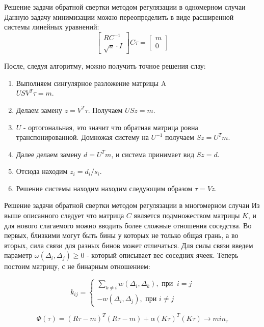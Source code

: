 \documentclass[fullscreen=true,russian,compress,%
	hyperref={unicode,bookmarks=false}]{presentation}
\begin{document}
\begin{frame}{Решение задачи обратной свертки методом регулязации в одномерном случаи}
Данную задачу минимизации можно переопределить в виде расширенной системы линейных уравнений:
\begin{equation}
       \begin{bmatrix}
           RC^{-1} \\
           \sqrt{a} \cdot I
       \end{bmatrix}
       C\tau = 
       \begin{bmatrix}
           m \\
           0
       \end{bmatrix}
       \label{system_one_dim}
   \end{equation}

После, следуя алгоритму, можно получить точное решения слау:

\begin{enumerate}
    \item Выполняем сингулярное разложение матрицы A \\
    $USV^T \tau = m.$
    \item Делаем замену $z = V^T\tau$. Получаем $USz = m.$
    \item $U$ - ортогональная, это значит что обратная матрица ровна транспонированной. Домножая систему на $U^{-1}$ получаем $Sz=U^Tm$.
    \item Далее делаем замену $d=U^Tm$, и система принимает вид $Sz=d$.
    \item Отсюда находим $z_{i} = d_{i} / s_{i}$.
    \item Решение системы находим находим следующим образом $\tau = Vz$.
\end{enumerate}

\end{frame}


\begin{frame}{Решение задачи обратной свертки методом регулязации в многомерном случаи}
   Из выше описанного следует что матрица $C$ является подмножеством матрицы $K$, и для нового слагаемого можно вводить более сложные
   отношения соседства. Во первых, близкими могут быть бины у которых не только общая грань, а во вторых, сила связи для разных бинов
   может отличаться. Для силы связи введем параметр $\omega(\Delta_{i}, \Delta_{j}) \geq 0$ - который описывает вес соседних ячеек. 
   Теперь постоим матрицу, с не бинарным отношением:
   
   \begin{equation}
    k_{ij} =
     \begin{cases}
       \displaystyle\sum_{k\neq i} w(\Delta_{i}, \Delta_{k}), \text{ при } \ i = j \\
       -w( \Delta_{i}, \Delta_{j} ), \text{ при } i \neq j
     \end{cases}
   \end{equation}

   \begin{equation}
      \Phi(\tau)=(R\tau-m)^T (R\tau-m) + \alpha(K\tau)^T(K\tau) \to min_{\tau}
      \label{min_n_dim}
   \end{equation}
\end{frame}
\end{document}
